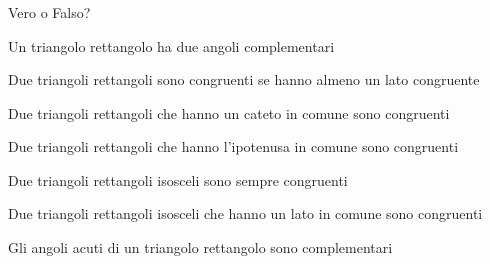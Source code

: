 \subsubsection*{}

\begin{esercizio}
\label{ese:3.52}
Vero o Falso?
\begin{enumeratea}
\item Un triangolo rettangolo ha due angoli 
complementari\hfill\boxV\quad\boxF
\item Due triangoli rettangoli sono congruenti se hanno almeno un 
lato congruente\hfill\boxV\quad\boxF
\item Due triangoli rettangoli che hanno un cateto in comune sono 
congruenti\hfill\boxV\quad\boxF
\item Due triangoli rettangoli che hanno l'ipotenusa in comune sono 
congruenti\hfill\boxV\quad\boxF
\item Due triangoli rettangoli isosceli sono sempre 
congruenti\hfill\boxV\quad\boxF
\item Due triangoli rettangoli isosceli che hanno un lato in comune 
sono congruenti\hfill\boxV\quad\boxF
\item Gli angoli acuti di un triangolo rettangolo sono 
complementari\hfill\boxV\quad\boxF
\end{enumeratea}
\end{esercizio}

